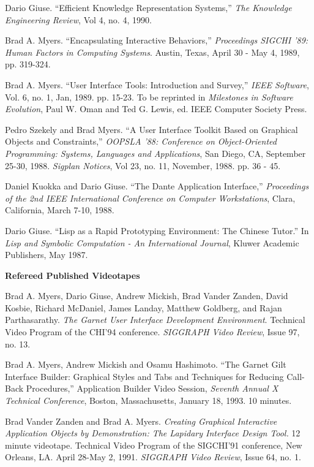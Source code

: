 Dario Giuse.  ``Efficient Knowledge Representation Systems,''
{\it The Knowledge Engineering Review}, Vol 4, no. 4, 1990.

Brad A. Myers. ``Encapsulating Interactive Behaviors,''
{\it Proceedings SIGCHI '89: Human Factors in Computing Systems}.
Austin, Texas, April 30 - May 4, 1989, pp. 319-324.

Brad A. Myers. ``User Interface Tools: Introduction
and Survey,'' {\it IEEE Software}, Vol. 6, no. 1, Jan, 1989. pp. 15-23. To
be reprinted in {\it Milestones in Software Evolution}, Paul W. Oman and
Ted G. Lewis, ed.  IEEE Computer Society Press.

Pedro Szekely and Brad Myers. ``A User Interface Toolkit Based on
Graphical Objects and Constraints,'' {\it OOPSLA '88: Conference on
Object-Oriented Programming: Systems, Languages and Applications},
San Diego, CA, September 25-30, 1988.
{\it Sigplan Notices}, Vol 23, no. 11, November, 1988. pp. 36 - 45.

Daniel Kuokka and Dario Giuse. ``The Dante Application Interface,''
{\it Proceedings of the 2nd IEEE International Conference on Computer
Workstations}, Clara, California, March 7-10, 1988.

Dario Giuse.  ``Lisp as a Rapid Prototyping Environment: The Chinese Tutor.''
In {\it Lisp and Symbolic Computation - An International Journal},
Kluwer Academic Publishers, May 1987.


{\bf Refereed Published Videotapes}

Brad A. Myers, Dario Giuse, Andrew Mickish, Brad Vander Zanden, David
Kosbie, Richard McDaniel, James Landay, Matthew Goldberg, and Rajan
Parthasarathy. {\it The Garnet User Interface Development Environment}.
Technical Video Program of the CHI'94 conference.
{\it SIGGRAPH Video Review}, Issue 97, no. 13.

Brad A. Myers, Andrew Mickish and Osamu Hashimoto.  ``The Garnet Gilt
Interface Builder: Graphical Styles and Tabs and Techniques for
Reducing Call-Back Procedures,'' Application Builder Video Session,
{\it Seventh Annual X Technical Conference}, Boston, Massachusetts,
January 18, 1993.  10 minutes.

Brad Vander Zanden and Brad A. Myers. {\it Creating Graphical
Interactive Application Objects by Demonstration: The Lapidary
Interface Design Tool.} 12 minute videotape.  Technical Video Program
of the SIGCHI'91 conference, New Orleans, LA.  April 28-May 2, 1991.
{\it SIGGRAPH Video Review}, Issue 64, no. 1.

